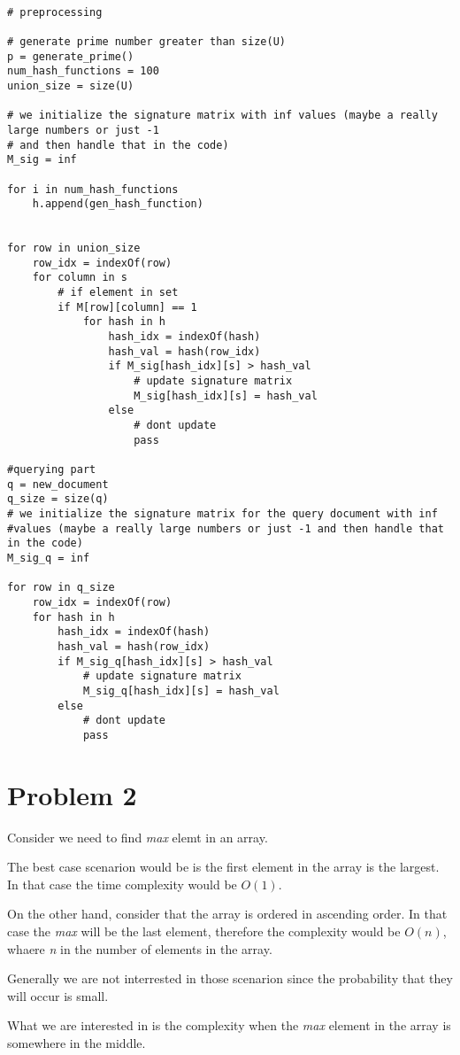 \documentclass[11pt]{article}
\begin{document}
\begin{lstlisting}

# preprocessing

# generate prime number greater than size(U)
p = generate_prime()
num_hash_functions = 100
union_size = size(U)

# we initialize the signature matrix with inf values (maybe a really large numbers or just -1 
# and then handle that in the code)
M_sig = inf

for i in num_hash_functions
	h.append(gen_hash_function)


for row in union_size
	row_idx = indexOf(row)
	for column in s
		# if element in set
		if M[row][column] == 1
			for hash in h
				hash_idx = indexOf(hash)
				hash_val = hash(row_idx)
				if M_sig[hash_idx][s] > hash_val
					# update signature matrix
					M_sig[hash_idx][s] = hash_val
				else
					# dont update
					pass

#querying part
q = new_document
q_size = size(q)
# we initialize the signature matrix for the query document with inf
#values (maybe a really large numbers or just -1 and then handle that in the code)
M_sig_q = inf

for row in q_size
	row_idx = indexOf(row)
	for hash in h
		hash_idx = indexOf(hash)
		hash_val = hash(row_idx)
		if M_sig_q[hash_idx][s] > hash_val
			# update signature matrix
			M_sig_q[hash_idx][s] = hash_val
		else
			# dont update
			pass

\end{lstlisting}



\section{Problem 2}
Consider we need to find \textit{max} elemt in an array.

The best case scenarion would be is the first element in the array is the largest. In that case the time complexity would be $ O(1) $.

On the other hand, consider that the array is ordered in ascending order.
In that case the \textit{max} will be the last element, therefore the complexity would be $ O(n) $, whaere \textit{n} in the number of elements in the array.

Generally we are not interrested in those scenarion since the probability that they will occur is small.

What we are interested in is the complexity when the \textit{max} element in the array is somewhere in the middle.
\end{document}
